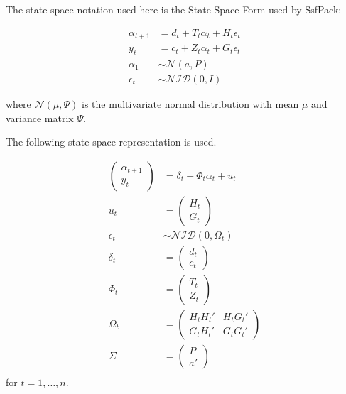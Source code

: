 \documentclass{article}\usepackage{graphicx, color}
\begin{document}
The state space notation used here is the State Space Form used by
SsfPack:

\begin{align}
  \label{eq:2}
  \alpha_{t + 1} & = d_t + T_t \alpha_t + H_t \epsilon_t \\
   y_t & = c_t + Z_t \alpha_t + G_t \epsilon_t \\
   \alpha_1 & \sim \mathcal{N}(a, P) \\
   \epsilon_t & \sim \mathcal{NID}(0, I)
\end{align}

where $\mathcal{N}(\mu, \Psi)$ is the multivariate normal distribution with mean $\mu$ and variance matrix $\Psi$.

The following state space representation is used.

\begin{align}
  \label{eq:3}

  \begin{pmatrix}
   \alpha_{t+1} \\
   y_t
   \end{pmatrix}  &= \delta_t + \Phi_t \alpha_t + u_t \\

   u_t &= 
   \begin{pmatrix}
   H_t \\
   G_t 
   \end{pmatrix} \\

   \epsilon_t & \sim \mathcal{NID}(0, \Omega_t) \\

   \delta_t &= 
   \begin{pmatrix}
   d_t \\ c_t
   \end{pmatrix} \\

   \Phi_t &= 
   \begin{pmatrix}
   T_t \\ Z_t
   \end{pmatrix} \\

   \Omega_t &= 
   \begin{pmatrix}
   H_t H_t' & H_t G_t' \\
   G_t H_t' & G_t G_t'
   \end{pmatrix} \\
   
   \Sigma &= 
   \begin{pmatrix}
   P \\ a'
   \end{pmatrix} \\
  
\end{align}
for $t = 1, \dots, n$.
\end{document}
